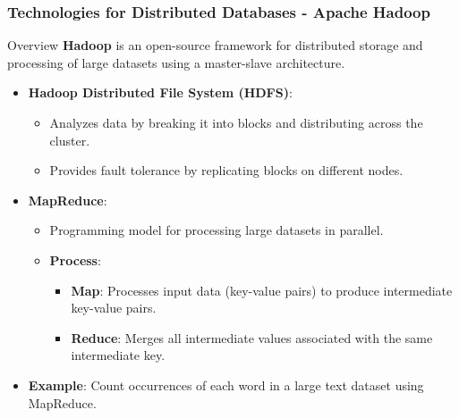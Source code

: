 \documentclass[aspectratio=169]{beamer}
\begin{document}
\begin{frame}[fragile]
  \frametitle{Technologies for Distributed Databases - Apache Hadoop}
  \begin{block}{Overview}
      \textbf{Hadoop} is an open-source framework for distributed storage and processing of large datasets using a master-slave architecture.
  \end{block}
  \begin{itemize}
      \item \textbf{Hadoop Distributed File System (HDFS)}:
          \begin{itemize}
              \item Analyzes data by breaking it into blocks and distributing across the cluster.
              \item Provides fault tolerance by replicating blocks on different nodes.
          \end{itemize}
      \item \textbf{MapReduce}:
          \begin{itemize}
              \item Programming model for processing large datasets in parallel.
              \item \textbf{Process}:
                  \begin{itemize}
                      \item \textbf{Map}: Processes input data (key-value pairs) to produce intermediate key-value pairs.
                      \item \textbf{Reduce}: Merges all intermediate values associated with the same intermediate key.
                  \end{itemize}
          \end{itemize}
      \item \textbf{Example}: Count occurrences of each word in a large text dataset using MapReduce.
  \end{itemize}
\end{frame}
\end{document}
